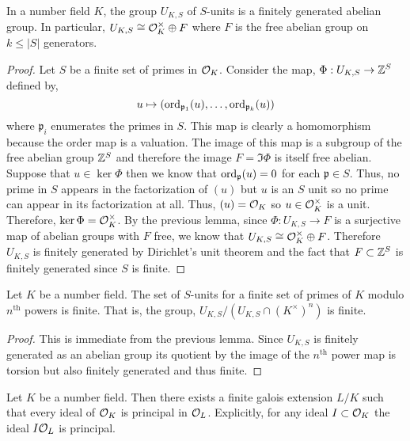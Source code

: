 \documentclass[12pt]{extarticle}
\begin{document}
\begin{lemma} \label{finite_s_units}
In a number field $K$, the group $U_{K,S}$ of $S$-units is a finitely generated abelian group. In particular, $U_{K,S} \cong \mathcal{O}_{K}^\times \oplus F$ where $F$ is the free abelian group on $k \le |S|$ generators. 
\end{lemma}

\begin{proof}
Let $S$ be a finite set of primes in $\mathcal{O}_{K}$. Consider the map, $\Phi : U_{K,S} \to \mathbb{Z}^S$ defined by, 
\[u \mapsto ( \mathrm{ord}_{\mathfrak{p}_1}(u), \dots, \mathrm{ord}_{\mathfrak{p}_k}(u))\]
where $\mathfrak{p}_i$ enumerates the primes in $S$. This map is clearly a homomorphism because the order map is a valuation. 
The image of this map is a subgroup of the free abelian group $\mathbb{Z}^S$ and therefore the image $F = \Im{\Phi}$ is itself free abelian. Suppose that $u \in \ker{\Phi}$ then we know that $\mathrm{ord}_{\mathfrak{p}} (u) = 0$ for each $\mathfrak{p} \in S$. Thus, no prime in $S$ appears in the factorization of $(u)$ but $u$ is an $S$ unit so no prime can appear in its factorization at all. Thus, $(u) = \mathcal{O}_{K}$ so $u \in \mathcal{O}_{K}^\times$ is a unit. Therefore, $\ker{\Phi} = \mathcal{O}_{K}^\times$. By the previous lemma, since $\Phi : U_{K,S} \to F$ is a surjective map of abelian groups with $F$ free, we know that $U_{K,S} \cong \mathcal{O}_{K}^\times \oplus F$. Therefore $U_{K,S}$ is finitely generated by Dirichlet's unit theorem and the fact that $F \subset \mathbb{Z}^S$ is finitely generated since $S$ is finite.   
\end{proof}

\begin{lemma} \label{finite_s_units}
Let $K$ be a number field. The set of $S$-units for a finite set of primes of $K$ modulo $n^{\text{th}}$ powers is finite. That is, the group, $U_{K,S} /(U_{K, S} \cap (K^\times)^n)$ is finite.
\end{lemma}

\begin{proof}
This is immediate from the previous lemma. Since $U_{K,S}$ is finitely generated as an abelian group its quotient by the image of the $n^{\text{th}}$ power map is torsion but also finitely generated and thus finite. 
\end{proof}

\begin{lemma} \label{big_enough_for_prin}
Let $K$ be a number field. Then there exists a finite galois extension $L / K$ such that every ideal of $\mathcal{O}_{K}$ is principal in $\mathcal{O}_{L}$. Explicitly, for any ideal $I \subset \mathcal{O}_{K}$ the ideal $I \mathcal{O}_{L}$ is principal. 
\end{lemma}
\end{document}
